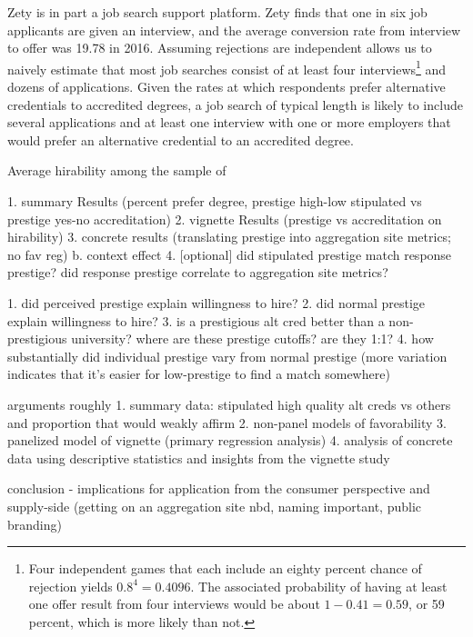 \documentclass[review]{elsarticle}
\begin{document}
Zety is in part a job search support platform.
Zety finds that one in six job applicants are given an interview,
and the average conversion rate from interview to offer was 19.78 in 2016\cite{turczynski_2021}.
Assuming rejections are independent allows us to naively estimate that most job searches consist of at least four interviews\footnote{
    Four independent games that each include an eighty percent chance of rejection yields $0.8^4 = 0.4096$.
    The associated probability of having at least one offer result from four interviews would be about $1 - 0.41 = 0.59$,
    or 59 percent, which is more likely than not.
} and dozens of applications.
Given the rates at which respondents prefer alternative credentials to accredited degrees,
a job search of typical length is likely to include several applications and at least one interview
with one or more employers that would prefer an alternative credential to an accredited degree.




Average hirability among the sample of 

1. summary Results (percent prefer degree, prestige high-low stipulated vs prestige yes-no accreditation)
2. vignette Results (prestige vs accreditation on hirability)
3. concrete results (translating prestige into aggregation site metrics; no fav reg)
    b. context effect
4. [optional] did stipulated prestige match response prestige? did response prestige correlate to aggregation site metrics?

1. did perceived prestige explain willingness to hire?
2. did normal prestige explain willingness to hire?
3. is a prestigious alt cred better than a non-prestigious university? where are these prestige cutoffs? are they 1:1?
4. how substantially did individual prestige vary from normal prestige (more variation indicates that it's easier for low-prestige to find a match somewhere)




arguments roughly
1. summary data: stipulated high quality alt creds vs others and proportion that would weakly affirm
2. non-panel models of favorability
3. panelized model of vignette (primary regression analysis)
4. analysis of concrete data using descriptive statistics and insights from the vignette study

conclusion - implications for application from the consumer perspective and supply-side (getting on an aggregation site nbd, naming important, public branding)
\end{document}
